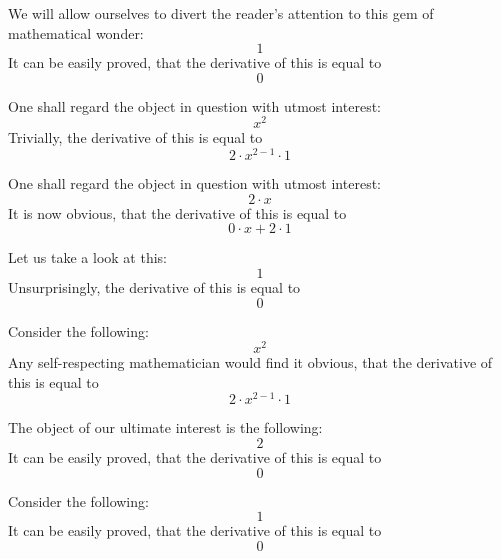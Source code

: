 \documentclass{article}
\begin{document}
We will allow ourselves to divert the reader's attention to this gem of mathematical wonder:
\begin{equation}
1 
\end{equation}
It can be easily proved, that the derivative of this is equal to
\begin{equation}
0 
\end{equation}

One shall regard the object in question with utmost interest:
\begin{equation}
x ^{2 } 
\end{equation}
Trivially, the derivative of this is equal to
\begin{equation}
2 \cdot x ^{2 - 1 } \cdot 1 
\end{equation}

One shall regard the object in question with utmost interest:
\begin{equation}
2 \cdot x 
\end{equation}
It is now obvious, that the derivative of this is equal to
\begin{equation}
0 \cdot x + 2 \cdot 1 
\end{equation}

Let us take a look at this:
\begin{equation}
1 
\end{equation}
Unsurprisingly, the derivative of this is equal to
\begin{equation}
0 
\end{equation}

Consider the following:
\begin{equation}
x ^{2 } 
\end{equation}
Any self-respecting mathematician would find it obvious, that the derivative of this is equal to
\begin{equation}
2 \cdot x ^{2 - 1 } \cdot 1 
\end{equation}

The object of our ultimate interest is the following:
\begin{equation}
2 
\end{equation}
It can be easily proved, that the derivative of this is equal to
\begin{equation}
0 
\end{equation}

Consider the following:
\begin{equation}
1 
\end{equation}
It can be easily proved, that the derivative of this is equal to
\begin{equation}
0 
\end{equation}
\end{document}
